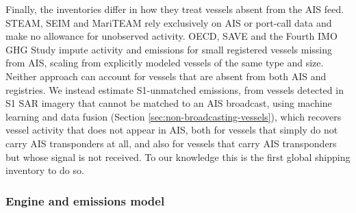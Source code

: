 Finally, the inventories differ in how they treat vessels absent from the AIS feed. STEAM, SEIM and MariTEAM rely exclusively on AIS or port-call data and make no allowance for unobserved activity. OECD, SAVE and the Fourth IMO GHG Study impute activity and emissions for small registered vessels missing from AIS, scaling from explicitly modeled vessels of the same type and size. Neither approach can account for vessels that are absent from both AIS and registries. We instead estimate S1-unmatched emissions, from vessels detected in S1 SAR imagery that cannot be matched to an AIS broadcast, using machine learning and data fusion (Section \ref{sec:non-broadcasting-vessels}), which recovers vessel activity that does not appear in AIS, both for vessels that simply do not carry AIS transponders at all, and also for vessels that carry AIS transponders but whose signal is not received. To our knowledge this is the first global shipping inventory to do so.

\subsubsection*{Engine and emissions model}

